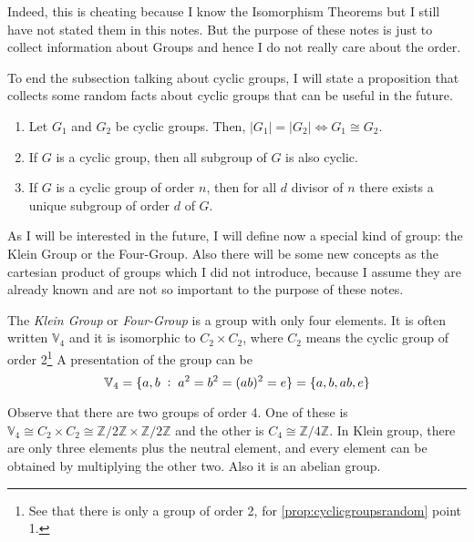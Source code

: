 \documentclass[../main.tex]{subfiles}
\begin{document}
Indeed, this is cheating because I know the Isomorphism Theorems but I still have not stated them in this notes. But the purpose of these notes is just to collect information about Groups and hence I do not really care about the order.

To end the subsection talking about cyclic groups, I will state a proposition that collects some random facts about cyclic groups that can be useful in the future.

\begin{prop}
\label{prop:cyclicgroupsrandom} \begin{enumerate}[(1)]
    \item Let $G_1$ and $G_2$ be cyclic groups. Then, $|G_1| = |G_2|\Longleftrightarrow G_1\cong G_2$.
    \item If $G$ is a cyclic group, then all subgroup of $G$ is also cyclic.
    \item If $G$ is a cyclic group of order $n$, then for all $d$ divisor of $n$ there exists a unique subgroup of order $d$ of $G$.
\end{enumerate}
\end{prop}

As I will be interested in the future, I will define now a special kind of group: the Klein Group or the Four-Group. Also there will be some new concepts as the cartesian product of groups which I did not introduce, because I assume they are already known and are not so important to the purpose of these notes.

\begin{defi}
 The \textit{Klein Group} or \textit{Four-Group} is a group with only four elements. It is often written $\mathbb{V}_4$ and it is isomorphic to $C_2\times C_2$, where $C_2$ means the cyclic group of order 2\footnote{See that there is only a group of order 2, for \ref{prop:cyclicgroupsrandom} point 1.} A presentation of the group can be 
\begin{equation}
    \notag
    \mathbb{V}_4 = \{a,b\;:\;a^2=b^2=(ab)^2=e\} = \{a,b,ab,e\}
\end{equation}
\end{defi}

Observe that there are two groups of order 4. One of these is $\mathbb{V}_4\cong C_2\times C_2\cong\mathbb{Z}/2\mathbb{Z}\times\mathbb{Z}/2\mathbb{Z}$ and the other is $C_4\cong \mathbb{Z}/4\mathbb{Z}$. In Klein group, there are only three elements plus the neutral element, and every element can be obtained by multiplying the other two. Also it is an abelian group.
\end{document}
